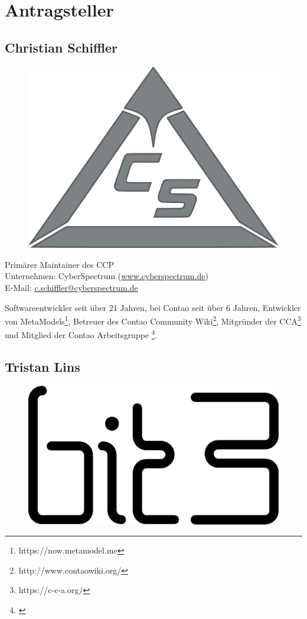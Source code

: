 \documentclass[
paper=a4,
draft=false,%
fontsize=10pt%
]{scrartcl}
\begin{document}
\newpage

%
%

\section{Antragsteller}
\label{sec:proposer}

\subsection*{Christian  Schiffler}

\begin{figure}
  \vspace{-50pt}
  \hfill
  \includegraphics[width=.2\textwidth]{bilder/cyberspectrum}
\end{figure}

Primärer Maintainer des CCP \\
Unternehmen: CyberSpectrum (\href{https://www.cyberspectrum.de}{www.cyberspectrum.de}) \\
E-Mail: \href{mailto:c.schiffler@cyberspectrum.de}{c.schiffler@cyberspectrum.de}

Softwareentwickler seit über 21 Jahren, bei Contao seit über 6 Jahren, Entwickler von MetaModels\footnote{https://now.metamodel.me}, Betreuer des Contao Community Wiki\footnote{http://www.contaowiki.org/}, Mitgründer der CCA\footnote{https://c-c-a.org/\label{fn:cca}} und Mitglied der Contao Arbeitsgruppe \footnote{\label{fn:contao-workgroup-core}}.

\subsection*{Tristan  Lins}

\begin{figure}
  \vspace{-40pt}
  \hfill
  \includegraphics[width=.2\textwidth]{bilder/bit3}
\end{figure}
\end{document}
